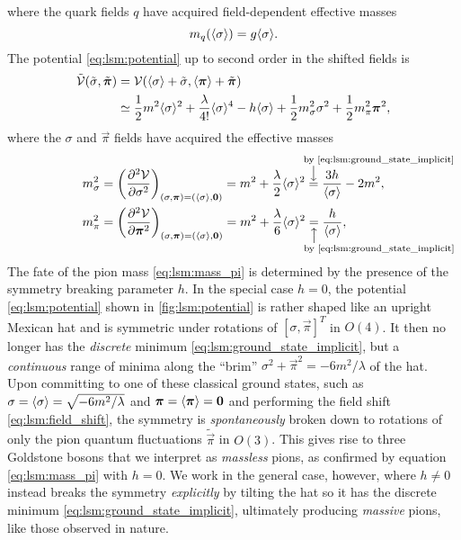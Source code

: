 where the quark fields $q$ have acquired field-dependent effective masses
\begin{equation}
	m_q(\langle \sigma \rangle) = g \langle \sigma \rangle .
\label{eq:lsm:mass_quark}
\end{equation}
The potential \eqref{eq:lsm:potential} up to second order in the shifted fields is
\begin{equation}
\begin{split}
	\tilde{\mathcal{V}}(\tilde{\sigma},\tilde{{\bm{\pi}}}) &= \mathcal{V}(\langle \sigma \rangle+\tilde{\sigma},\langle {\bm{\pi}} \rangle+\tilde{{\bm{\pi}}}) \\
	                                             &\simeq \frac12 m^2 \langle \sigma \rangle^2 + \frac{\lambda}{4!} \langle \sigma \rangle^4 - h \langle \sigma \rangle + \frac12 m_\sigma^2 \sigma^2  + \frac12 m_\pi^2 {\bm{\pi}}^2 ,
\label{eq:lsm:potential_shifted}
\end{split}
\end{equation}
where the $\sigma$ and $\vec\pi$ fields have acquired the effective masses
\begin{subequations}
\begin{align}
	m_\sigma^2 &= \pdv[2]{\pot}{\sigma}_{(\sigma,\vec\pi)=(\avg{\sigma},\vec{0})}    = m^2 + \frac{\lambda}{2} \avg{\sigma}^2 \equalexplabove{\text{by \eqref{eq:lsm:ground_state_implicit}}} \frac{3h}{\avg{\sigma}} - 2 m^2 , \label{eq:lsm:mass_sigma} \\
	m_\pi^2    &= \pdv[2]{\pot}{\vec{\pi}}_{(\sigma,\vec\pi)=(\avg{\sigma},\vec{0})} = m^2 + \frac{\lambda}{6} \avg{\sigma}^2 \equalexplbelow{\text{by \eqref{eq:lsm:ground_state_implicit}}} \frac{h}{\avg{\sigma}} , \label{eq:lsm:mass_pi}
\end{align}%
\label{eq:lsm:mass_sigmapi}%
\end{subequations}%
The fate of the pion mass \eqref{eq:lsm:mass_pi} is determined by the presence of the symmetry breaking parameter $h$.
In the special case $h = 0$, the potential \eqref{eq:lsm:potential} shown in \cref{fig:lsm:potential} is rather shaped like an upright Mexican hat and is symmetric under rotations of $[\sigma,\vec{\pi}]^T$ in $O(4)$.
It then no longer has the \emph{discrete} minimum \eqref{eq:lsm:ground_state_implicit}, but a \emph{continuous} range of minima along the ``brim'' $\sigma^2 + \vec{\pi}^2 = -6m^2/\lambda$ of the hat.
Upon committing to one of these classical ground states, such as $\sigma=\langle \sigma \rangle=\sqrt{-6m^2/\lambda}$ and ${\bm{\pi}}=\langle {\bm{\pi}} \rangle={\bm{0}}$ and performing the field shift \eqref{eq:lsm:field_shift},
the symmetry is \emph{spontaneously} broken down to rotations of only the pion quantum fluctuations $\tilde{\vec{\pi}}$ in $O(3)$.
This gives rise to three Goldstone bosons that we interpret as \emph{massless} pions, as confirmed by equation \eqref{eq:lsm:mass_pi} with $h = 0$.
We work in the general case, however, where $h \neq 0$ instead breaks the symmetry \emph{explicitly} by tilting the hat so it has the discrete minimum \eqref{eq:lsm:ground_state_implicit}, ultimately producing \emph{massive} pions, like those observed in nature.

